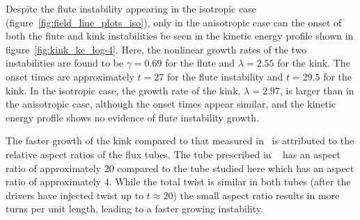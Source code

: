 \documentclass[fleqn,usenatbib]{mnras}
\begin{document}
Despite the flute instability appearing in the isotropic
case (figure~\ref{fig:field_line_plots_iso}), only in the
anisotropic case can the onset of both the
flute and kink instabilities be seen in the kinetic
energy profile shown in figure~\ref{fig:kink_ke_log-4}. Here, the nonlinear
growth rates of the two instabilities are found to be $\gamma = 0.69$
for the flute and $\lambda = 2.55$ for the kink. The
onset times are approximately $t=27$ for the flute
instability and $t=29.5$ for
the kink. In the isotropic case, the growth rate of the kink, $\lambda
= 2.97$, is larger than in the anisotropic case,
although the onset times appear similar, and the kinetic energy
profile shows no evidence of flute instability growth. 

The faster growth of the kink compared to that measured in~
\citet{quinnEffectAnisotropicViscosity2020} is attributed to
the relative aspect ratios of the flux tubes. The tube prescribed in
~\citep{quinnEffectAnisotropicViscosity2020} has an aspect
ratio of approximately $20$ compared to the tube studied here which
has an aspect ratio of approximately $4$. While the total twist is
similar in both tubes (after the drivers have injected twist up to
$t\approx20$) the small aspect ratio results in more turns per unit
length, leading to a faster growing instability. 
\end{document}

